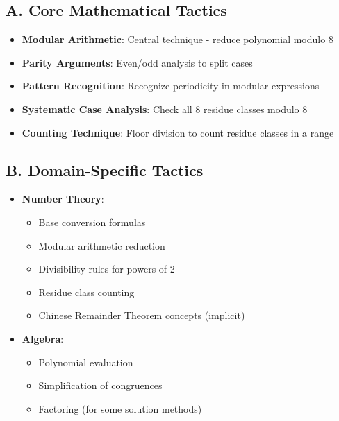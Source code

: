\documentclass[11pt]{article}
\begin{document}
\begin{tacticalbox}
\subsection*{A. Core Mathematical Tactics}
\begin{itemize}[leftmargin=*]
    \item \textbf{Modular Arithmetic}: Central technique - reduce polynomial modulo 8
    
    \item \textbf{Parity Arguments}: Even/odd analysis to split cases
    
    \item \textbf{Pattern Recognition}: Recognize periodicity in modular expressions
    
    \item \textbf{Systematic Case Analysis}: Check all 8 residue classes modulo 8
    
    \item \textbf{Counting Technique}: Floor division to count residue classes in a range
\end{itemize}

\subsection*{B. Domain-Specific Tactics}
\begin{itemize}[leftmargin=*]
    \item \textbf{Number Theory}: 
    \begin{itemize}
        \item Base conversion formulas
        \item Modular arithmetic reduction
        \item Divisibility rules for powers of 2
        \item Residue class counting
        \item Chinese Remainder Theorem concepts (implicit)
    \end{itemize}
    
    \item \textbf{Algebra}: 
    \begin{itemize}
        \item Polynomial evaluation
        \item Simplification of congruences
        \item Factoring (for some solution methods)
    \end{itemize}
    

\end{itemize}
\end{tacticalbox}
\end{document}
